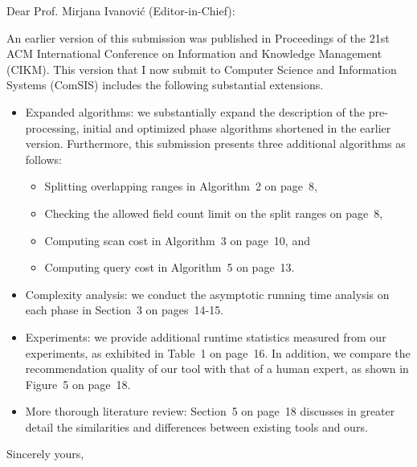\documentclass{letter} %
\begin{document}
\begin{letter}
\opening{Dear Prof. Mirjana Ivanovi\'c (Editor-in-Chief):} 
 
\noindent An earlier version of this submission was published in Proceedings of the 21st ACM \hbox{International} Conference on Information and Knowledge Management (CIKM). 
This version that I now submit to Computer Science and Information Systems (ComSIS) includes the following substantial extensions.

\begin{itemize}

\item Expanded algorithms: we substantially expand the description of the pre-processing, initial and optimized phase algorithms shortened in the earlier version. Furthermore, this submission presents three additional algorithms as follows:

\begin{itemize}

\item Splitting overlapping ranges in Algorithm~2 on page~8,
\item Checking the allowed field count limit on the split ranges on page~8,
\item Computing scan cost in Algorithm~3 on page~10, and
\item Computing query cost in Algorithm~5 on page~13.

\end{itemize} 
 
\item Complexity analysis: we conduct the asymptotic running time analysis on each phase in Section~3 on pages~14-15.

\item Experiments: we provide additional runtime statistics measured from our experiments, as exhibited in Table~1 on page~16. 
In addition, we compare the recommendation quality of our tool with that of a human expert, as shown in Figure~5 on page~18.

\item More thorough literature review: Section~5 on page~18 discusses in greater detail the similarities and differences between existing tools 
and ours.

\end{itemize} 
 
\closing{Sincerely yours,} 

\end{letter}
 
\end{document}
